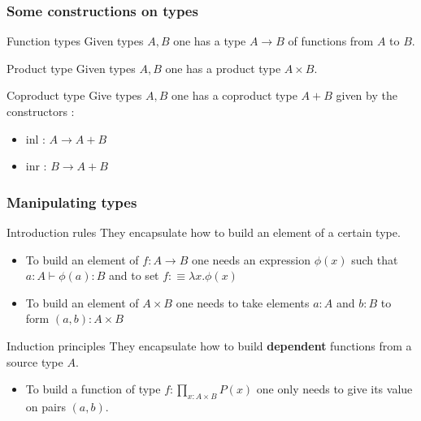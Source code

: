 \documentclass{beamer}
\begin{document}
        \begin{frame}
            \frametitle{Some constructions on types}
            \begin{exampleblock}{Function types}
                Given types $A,B$ one has a type $A \rightarrow B$ of functions from $A$ to $B$.
            \end{exampleblock}
            \pause
            \begin{exampleblock}{Product type}
                Given types $A,B$ one has a product type $A \times B$.
            \end{exampleblock}
            \pause
            \begin{exampleblock}{Coproduct type}
                Give types $A,B$ one has a coproduct type $A+B$ given by the constructors :
                \begin{itemize}
                    \item inl : $A \rightarrow A+B$
                    \item inr : $B \rightarrow A+B$
                  \end{itemize}
            \end{exampleblock}
        \end{frame}

        \begin{frame}
            \frametitle{Manipulating types}
            \begin{block}{Introduction rules}
                They encapsulate how to build an element of a certain type.
                \begin{itemize}
                    \item To build an element of $ f: A \rightarrow B$ one needs an expression $\phi(x)$ such that $a : A \vdash \phi(a) : B$ and to set $f :\equiv \lambda x. \phi(x)$
                    \item To build an element of $A \times B$ one needs to take elements $a : A$ and $b : B$ to form $(a,b) : A \times B$
                \end{itemize}
            \end{block}
            \pause
            \begin{block}{Induction principles}
                They encapsulate how to build \textbf{dependent} functions from a source type $A$.
                \begin{itemize}
                    \item To build a function of type $f : \prod_{x : A\times B} P(x)$ one only needs to give its value on pairs $(a,b)$. 
                \end{itemize}
            \end{block}
        \end{frame}
\end{document}
